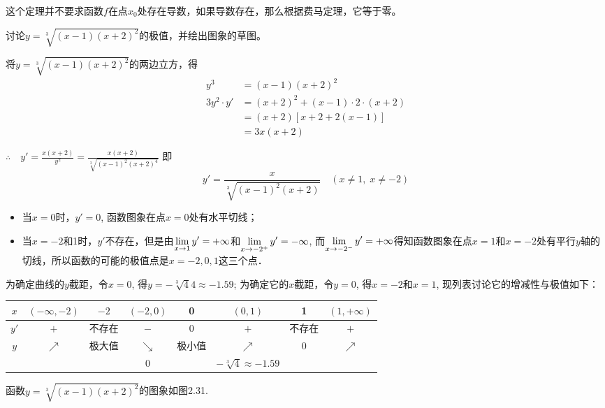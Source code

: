 \begin{rmk}
    这个定理并不要求函数$f$在点$x_0$处存在导数，如果导数存在，那么根据费马定理，它等于零。
\end{rmk}


\begin{example}
    讨论$y=\sqrt[3]{(x-1)(x+2)^2}$的极值，并绘出图象的草图。
\end{example}

\begin{solution}
将$y=\sqrt[3]{(x-1)(x+2)^2}$的两边立方，得
\[\begin{split}
    y^3&= (x-1) (x+2)^2\\
    3y^2\cdot y'&= (x+2)^2+ (x-1)\cdot 2\cdot  (x+2)\\
    &= (x+2) [x+2+2(x-1)]\\
    &=3x (x+2) 
\end{split}\]

$\therefore\quad 
y'=\frac{x (x+2)}{y^2}=\frac{x (x+2)}{\sqrt[3]{(x-1)^2(x+2)^4}}$
即
\[y'=\frac{x}{\sqrt[3]{(x-1)^2(x+2)}}\quad 
(x\ne 1,\; x\ne -2)\]
\begin{itemize}
    \item 当$x=0$时，$y'=0$, 函数图象在点$x=0$处有水平切线；
    \item 当$x=-2$和1时，$y'$不存在，但是由$\displaystyle\lim_{x\to 1}y'=+\infty$和$\displaystyle\lim_{x\to -2^+}y'=-\infty$, 而$\displaystyle\lim_{x\to -2^-}y'=+\infty$得知函数图象在点$x=1$和$x=-2$处有平行$y$轴的切线，所以函数的可能的极值点是$x=-2, 0, 1$这三个点．
\end{itemize}

为确定曲线的$y$截距，令$x=0$, 得$y=-\sqrt[3]{4}4\approx -1.59$; 为确定它的$x$截距，令$y=0$, 得$x=-2$和$x=1$, 现列表讨论它的增减性与极值如下：
\begin{center}
\begin{tabular}{c|ccccccc}
\hline
$x$ &$(-\infty,-2)$ & $-2$ & $(-2,0)$ & 0&$(0,1)$& 1& $(1,+\infty)$\\
\hline
$y'$ & $+$ & 不存在 & $-$ &0&$+$&不存在&$+$\\
$y$ & $\nearrow$ &极大值&$\searrow$ &极小值&$\nearrow$ &0&$\nearrow$\\ 
&&&0&&$-\sqrt[3]{4}\approx -1.59$\\
\hline
\end{tabular}
\end{center}

函数$y=\sqrt[3]{(x-1)(x+2)^2}$的图象如图2.31.
\begin{figure}[htp]
    \centering
{}
\end{figure}
\end{solution}
